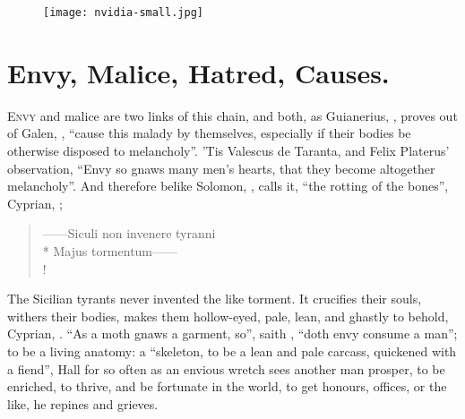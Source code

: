 \cleartoleftpage{}
\begin{figure}[p]
  \begingroup
  \centering
  \texttt{[image: nvidia-small.jpg]}
  \label{fig:invidia}
\end{figure}

\clearpage{}
\thispagestyle{titleontop}

\section{Envy, Malice, Hatred, Causes.}

\lettrine{E}{nvy} and malice are two links of this chain, and both, as
Guianerius, , proves out of Galen,
, \enquote{cause this
malady by themselves, especially if their bodies be otherwise disposed to
melancholy}. 'Tis Valescus de Taranta, and Felix Platerus' observation,
\enquote{Envy so gnaws many men's hearts, that they become
altogether melancholy}. And therefore belike Solomon, , calls it, \enquote{the rotting of the bones}, Cyprian, ;

\begin{latin}
\begin{verse}%
------Siculi non invenere tyranni\\*
Majus tormentum------\\!
\end{verse}%
\end{latin}

The Sicilian tyrants never invented the like torment. It crucifies their souls,
withers their bodies, makes them hollow-eyed, pale, lean,
and ghastly to behold, Cyprian, . \enquote{As a moth gnaws a garment, so}, saith
\Chrysostom{}, \enquote{doth envy consume a man}; to be a living anatomy: a \enquote{skeleton, to
be a lean and pale carcass, quickened with a
fiend}, Hall  for so
often as an envious wretch sees another man prosper, to be enriched, to thrive,
and be fortunate in the world, to get honours, offices, or the like, he repines
and grieves.


